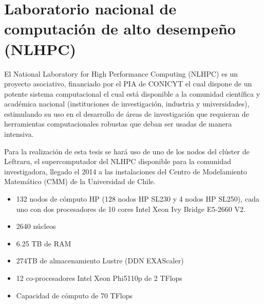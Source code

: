 \section{Laboratorio nacional de computaci\'on de alto desempe\~no (NLHPC)}
El National Laboratory for High Performance Computing (NLHPC) es un proyecto asociativo, financiado por el PIA de CONICYT el cual dispone de un potente sistema computacional el cual est\'a disponible a la comunidad cient\'ifica y acad\'emica nacional (instituciones de investigaci\'on, industria y universidades), estimulando su uso en el desarrollo de \'areas de investigaci\'on que requieran de herramientas computacionales robustas que deban ser usadas de manera intensiva. 
\bigskip

Para la realizaci\'on de esta tesis se har\'a uso de uno de los nodos del cl\'uster de Leftraru, el supercomputador del NLHPC disponible para la comunidad investigadora, llegado el 2014 a las instalaciones del Centro de Modelamiento Matem\'atico (CMM) de la Universidad de Chile.  

\begin{itemize}
\item 132 nodos de c\'omputo HP (128 nodos HP SL230 y 4 nodos HP SL250), cada uno con dos procesadores de 10 cores Intel Xeon Ivy Bridge E5-2660 V2.
\item 2640 n\'ucleos
\item 6.25 TB de RAM
\item 274TB de almacenamiento Lustre (DDN EXAScaler)
\item 12 co-procesadores Intel Xeon Phi5110p de 2 TFlops
\item Capacidad de c\'omputo de 70 TFlops 
\end{itemize} 

